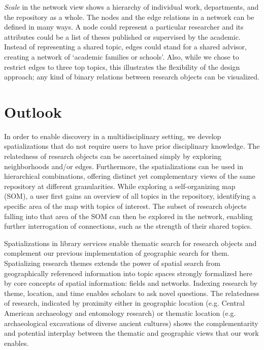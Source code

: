 \documentclass[a4paper,UKenglish]{lipics-v2018}
\begin{document}
\textit{Scale} in the network view shows a hierarchy of individual work, departments, and the repository as a whole. The nodes and the edge relations in a network can be defined in many ways. A node could represent a particular researcher and its attributes could be a list of theses published or supervised by the academic. Instead of representing a shared topic, edges could stand for a shared advisor, creating a network of ‘academic families or schools’. Also, while we chose to restrict edges to three top topics, this illustrates the flexibility of the design approach; any kind of binary relations between research objects can be visualized.

\section{Outlook}
In order to enable discovery in a multidisciplinary setting, we develop spatializations that do not require users to have prior disciplinary knowledge. The relatedness of research objects can be ascertained simply by exploring neighborhoods and/or edges. Furthermore, the spatializations can be used in hierarchical combinations, offering distinct yet complementary views of the same repository at different granularities. While exploring a self-organizing map (SOM), a user first gains an overview of all topics in the repository, identifying a specific area of the map with topics of interest. The subset of research objects falling into that area of the SOM can then be explored in the network, enabling further interrogation of connections, such as the strength of their shared topics.


Spatializations in library services enable thematic search for research objects and complement our previous implementation of geographic search for them. Spatializing research themes extends the power of spatial search from geographically referenced information into topic spaces strongly formalized here by core concepts of spatial information: fields and networks. Indexing research by theme, location, and time \cite{Sinton1977} enables scholars to ask novel questions. The relatedness of research, indicated by proximity either in geographic location (e.g. Central American archaeology and entomology research) or thematic location (e.g. archaeological excavations of diverse ancient cultures) shows the complementarity and potential interplay between the thematic and geographic views that our work enables.
\end{document}
